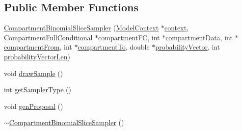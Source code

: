 \subsection*{Public Member Functions}
\begin{DoxyCompactItemize}
\item 
\hyperlink{classSpatialSEIR_1_1CompartmentBinomialSliceSampler_a9ebfe2b2d471f4bcc8dff23cd23685fa}{Compartment\-Binomial\-Slice\-Sampler} (\hyperlink{classSpatialSEIR_1_1ModelContext}{Model\-Context} $\ast$\hyperlink{classSpatialSEIR_1_1CompartmentBinomialSliceSampler_ad5631c8afe2fe4d0e8563b72fae517b0}{context}, \hyperlink{classSpatialSEIR_1_1CompartmentFullConditional}{Compartment\-Full\-Conditional} $\ast$\hyperlink{classSpatialSEIR_1_1CompartmentBinomialSliceSampler_abd146e1a97514494297f7863a61d381d}{compartment\-F\-C}, int $\ast$\hyperlink{classSpatialSEIR_1_1CompartmentBinomialSliceSampler_a6094cf1e5d3773db4d89186f19507c99}{compartment\-Data}, int $\ast$\hyperlink{classSpatialSEIR_1_1CompartmentBinomialSliceSampler_a7a8d30fa7485e4db0e68faa38aa7bc61}{compartment\-From}, int $\ast$\hyperlink{classSpatialSEIR_1_1CompartmentBinomialSliceSampler_a51e5687941d0911f0c5760af847b9c5d}{compartment\-To}, double $\ast$\hyperlink{classSpatialSEIR_1_1CompartmentBinomialSliceSampler_aff766a8c61753ae89e8b1a6ffea0d108}{probability\-Vector}, int \hyperlink{classSpatialSEIR_1_1CompartmentBinomialSliceSampler_aac982be0c3ae19b0a9960c0dbd1107ac}{probability\-Vector\-Len})
\item 
void \hyperlink{classSpatialSEIR_1_1CompartmentBinomialSliceSampler_a6d89f57c350e131068718374ae0d135f}{draw\-Sample} ()
\item 
int \hyperlink{classSpatialSEIR_1_1CompartmentBinomialSliceSampler_a35f2ba8531217f1fa227da3b801d05dd}{get\-Sampler\-Type} ()
\item 
void \hyperlink{classSpatialSEIR_1_1CompartmentBinomialSliceSampler_a231c0b5e4334099ef663ad5d59809ded}{gen\-Proposal} ()
\item 
\hyperlink{classSpatialSEIR_1_1CompartmentBinomialSliceSampler_af0661567a3b84368cf8c5e64a6f4fc3e}{$\sim$\-Compartment\-Binomial\-Slice\-Sampler} ()
\end{DoxyCompactItemize}

